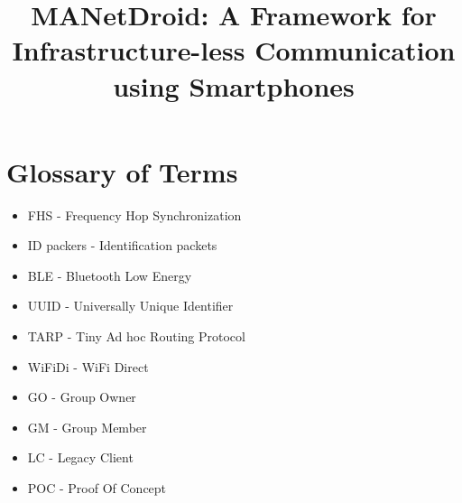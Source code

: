 \documentclass[12pt, conference, onecolumn, a4paper]{IEEEtran}
\title{MANetDroid: A Framework for Infrastructure-less Communication using Smartphones}
\begin{document}
\tableofcontents
\newpage

\section*{Glossary of Terms}
\begin{itemize}
    \item FHS - Frequency Hop Synchronization

    \item ID packers - Identification packets

    \item BLE - Bluetooth Low Energy

    \item UUID - Universally Unique Identifier

    \item TARP - Tiny Ad hoc Routing Protocol

    \item WiFiDi - WiFi Direct

    \item GO - Group Owner

    \item GM - Group Member

    \item LC - Legacy Client
    
    \item POC - Proof Of Concept 

\end{itemize}


\newpage










\end{document}

